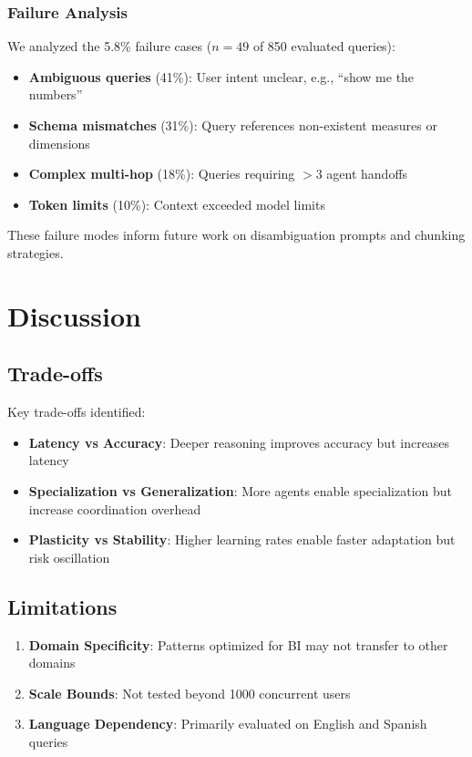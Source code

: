 \documentclass[11pt,a4paper]{article}
\theoremstyle{definition}
\theoremstyle{remark}
\begin{document}
\subsubsection{Failure Analysis}

We analyzed the 5.8\% failure cases ($n=49$ of 850 evaluated queries):

\begin{itemize}
    \item \textbf{Ambiguous queries} (41\%): User intent unclear, e.g., ``show me the numbers''
    \item \textbf{Schema mismatches} (31\%): Query references non-existent measures or dimensions
    \item \textbf{Complex multi-hop} (18\%): Queries requiring $>3$ agent handoffs
    \item \textbf{Token limits} (10\%): Context exceeded model limits
\end{itemize}

These failure modes inform future work on disambiguation prompts and chunking strategies.

\section{Discussion}
\label{sec:discussion}

\subsection{Trade-offs}

Key trade-offs identified:

\begin{itemize}
    \item \textbf{Latency vs Accuracy}: Deeper reasoning improves accuracy but increases latency
    \item \textbf{Specialization vs Generalization}: More agents enable specialization but increase coordination overhead
    \item \textbf{Plasticity vs Stability}: Higher learning rates enable faster adaptation but risk oscillation
\end{itemize}

\subsection{Limitations}

\begin{enumerate}
    \item \textbf{Domain Specificity}: Patterns optimized for BI may not transfer to other domains
    \item \textbf{Scale Bounds}: Not tested beyond 1000 concurrent users
    \item \textbf{Language Dependency}: Primarily evaluated on English and Spanish queries
\end{enumerate}
\end{document}
